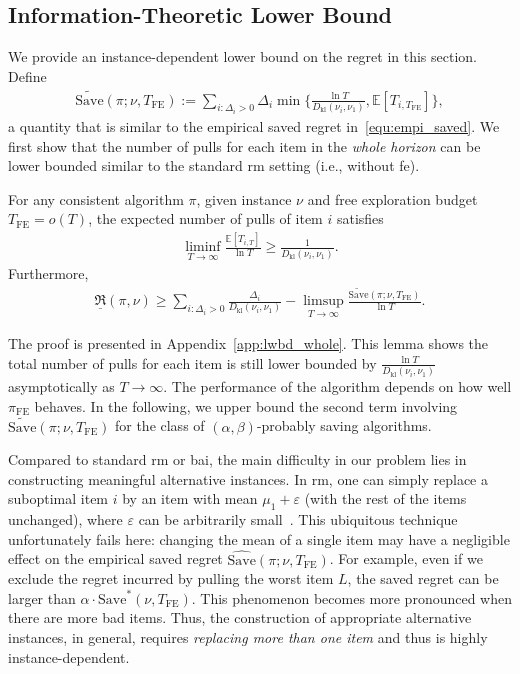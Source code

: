 \documentclass[twoside,11pt]{article}
\newcommand{\kl}{D_{\mathrm{kl}}}
\newcommand{\bbE}{\mathbb{E}}
\newcommand{\Tfe}{T_{\mathrm{FE}}}
\newcommand{\Saved}{\mathrm{Save}}
\newcommand{\FE}{\textrm{FE}}
\begin{document}
\subsection{Information-Theoretic Lower Bound}\label{sec:lwbd}
We provide an instance-dependent lower bound on the regret in this section.
Define
\begin{align}
    \widetilde{\Saved}(\pi;\nu,\Tfe):=\sum_{i:\Delta_i>0} \Delta_i \min\bigg\{\frac{\ln T}{\kl(\nu_i,\nu_1)},\bbE[T_{i,\Tfe}]\bigg\},
\end{align}
a quantity that is similar to the empirical saved regret in~\eqref{equ:empi_saved}. We  first  show that the number of pulls for each item in the \textit{whole horizon} can be lower bounded similar to  the standard \ac{rm} setting  (i.e., without \ac{fe}).
\begin{lemma}\label{lem:lwbd_whole}
    For any consistent algorithm $\pi$, given instance $\nu$ and free exploration budget $\Tfe=o(T)$, the expected number of  pulls of item $i$ satisfies
    \begin{align}
        \liminf_{T\to\infty}\frac{\bbE[T_{i,T}]}{\ln T}
        \geq
        \frac{1}{\kl(\nu_i,\nu_1)}.
    \end{align}
    Furthermore, 
 \begin{align}
    \underline{\mathfrak{R}}(\pi,\nu)
      \ge  \sum_{i:\Delta_i>0}\!\!\frac{\Delta_i}{\kl(\nu_i,\nu_1)}
        -
        \limsup_{T\to\infty}
        \frac{\widetilde{\Saved}(\pi;\nu,\Tfe)}{\ln T}.
\end{align}
\end{lemma}
The proof is presented in Appendix~\ref{app:lwbd_whole}.
This lemma shows the total number of pulls for each item is still lower bounded by $\frac{\ln T}{\kl(\nu_i,\nu_1)}$ asymptotically as $T\to\infty$. The performance of the algorithm depends on how well  $\pi_{\FE}$ behaves. 
In the following, we   upper bound the second term  involving $\widetilde{\Saved}(\pi;\nu,\Tfe) $ for the class of $(\alpha, \beta)$-probably saving  algorithms.

Compared to standard \ac{rm} or \ac{bai}, the main difficulty in our problem lies in constructing meaningful alternative instances. In   \ac{rm}, one can simply replace a suboptimal item $i$ by an item with mean $\mu_1+\varepsilon$ (with the rest of the items unchanged), where $\varepsilon$ can be arbitrarily small~\citep{lai1985asymptotically,burnetas96}.   This  ubiquitous technique unfortunately fails here: changing the mean of a single item may have a negligible effect on the empirical saved regret $\widehat{\Saved}(\pi;\nu,\Tfe)$. For example, even if we exclude the regret incurred by  pulling the worst item $L$, the saved regret can be larger than $\alpha\cdot\Saved^*(\nu,\Tfe)$. This phenomenon becomes more pronounced when there are more bad items. Thus, the construction of  appropriate alternative instances, in general, requires {\em replacing more than one item}  and thus is highly instance-dependent.
\end{document}
